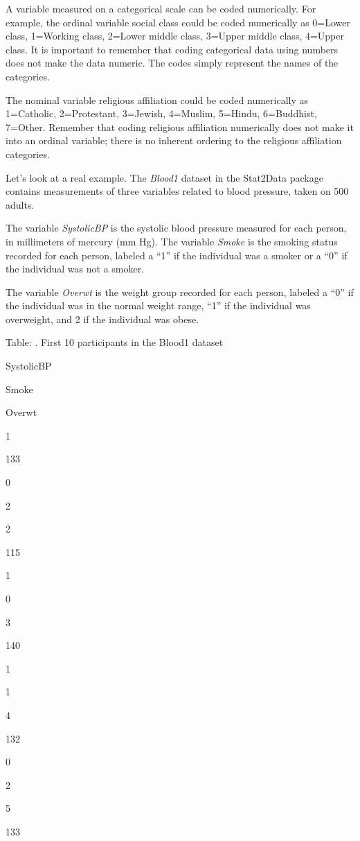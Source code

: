 \documentclass[
]{book}
\begin{document}
A variable measured on a categorical scale can be coded numerically. For example, the ordinal variable social class could be coded numerically as 0=Lower class, 1=Working class, 2=Lower middle class, 3=Upper middle class, 4=Upper class. It is important to remember that coding categorical data using numbers does not make the data numeric. The codes simply represent the names of the categories.

The nominal variable religious affiliation could be coded numerically as 1=Catholic, 2=Protestant, 3=Jewish, 4=Muslim, 5=Hindu, 6=Buddhist, 7=Other. Remember that coding religious affiliation numerically does not make it into an ordinal variable; there is no inherent ordering to the religious affiliation categories.

Let's look at a real example. The \emph{Blood1} dataset in the Stat2Data package contains measurements of three variables related to blood pressure, taken on 500 adults.

The variable \emph{SystolicBP} is the systolic blood pressure measured for each person, in millimeters of mercury (mm Hg).
The variable \emph{Smoke} is the smoking status recorded for each person, labeled a ``1'' if the individual was a smoker or a ``0'' if the individual was not a smoker.

The variable \emph{Overwt} is the weight group recorded for each person, labeled a ``0'' if the individual was in the normal weight range, ``1'' if the individual was overweight, and 2 if the individual was obese.

Table: \label{tab:blood1}. First 10 participants in the Blood1 dataset

SystolicBP

Smoke

Overwt

1

133

0

2

2

115

1

0

3

140

1

1

4

132

0

2

5

133
\end{document}

